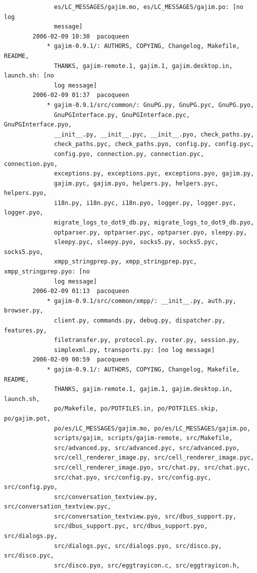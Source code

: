 \documentclass[a4paper]{article}
\begin{document}
\begin{verbatim}
              es/LC_MESSAGES/gajim.mo, es/LC_MESSAGES/gajim.po: [no log
              message]
        2006-02-09 10:30  pacoqueen
            * gajim-0.9.1/: AUTHORS, COPYING, Changelog, Makefile, README,
              THANKS, gajim-remote.1, gajim.1, gajim.desktop.in, launch.sh: [no
              log message]
        2006-02-09 01:37  pacoqueen
            * gajim-0.9.1/src/common/: GnuPG.py, GnuPG.pyc, GnuPG.pyo,
              GnuPGInterface.py, GnuPGInterface.pyc, GnuPGInterface.pyo,
              __init__.py, __init__.pyc, __init__.pyo, check_paths.py,
              check_paths.pyc, check_paths.pyo, config.py, config.pyc,
              config.pyo, connection.py, connection.pyc, connection.pyo,
              exceptions.py, exceptions.pyc, exceptions.pyo, gajim.py,
              gajim.pyc, gajim.pyo, helpers.py, helpers.pyc, helpers.pyo,
              i18n.py, i18n.pyc, i18n.pyo, logger.py, logger.pyc, logger.pyo,
              migrate_logs_to_dot9_db.py, migrate_logs_to_dot9_db.pyo,
              optparser.py, optparser.pyc, optparser.pyo, sleepy.py,
              sleepy.pyc, sleepy.pyo, socks5.py, socks5.pyc, socks5.pyo,
              xmpp_stringprep.py, xmpp_stringprep.pyc, xmpp_stringprep.pyo: [no
              log message]
        2006-02-09 01:13  pacoqueen
            * gajim-0.9.1/src/common/xmpp/: __init__.py, auth.py, browser.py,
              client.py, commands.py, debug.py, dispatcher.py, features.py,
              filetransfer.py, protocol.py, roster.py, session.py,
              simplexml.py, transports.py: [no log message]
        2006-02-09 00:59  pacoqueen
            * gajim-0.9.1/: AUTHORS, COPYING, Changelog, Makefile, README,
              THANKS, gajim-remote.1, gajim.1, gajim.desktop.in, launch.sh,
              po/Makefile, po/POTFILES.in, po/POTFILES.skip, po/gajim.pot,
              po/es/LC_MESSAGES/gajim.mo, po/es/LC_MESSAGES/gajim.po,
              scripts/gajim, scripts/gajim-remote, src/Makefile,
              src/advanced.py, src/advanced.pyc, src/advanced.pyo,
              src/cell_renderer_image.py, src/cell_renderer_image.pyc,
              src/cell_renderer_image.pyo, src/chat.py, src/chat.pyc,
              src/chat.pyo, src/config.py, src/config.pyc, src/config.pyo,
              src/conversation_textview.py, src/conversation_textview.pyc,
              src/conversation_textview.pyo, src/dbus_support.py,
              src/dbus_support.pyc, src/dbus_support.pyo, src/dialogs.py,
              src/dialogs.pyc, src/dialogs.pyo, src/disco.py, src/disco.pyc,
              src/disco.pyo, src/eggtrayicon.c, src/eggtrayicon.h,

\end{verbatim}
\end{document}
